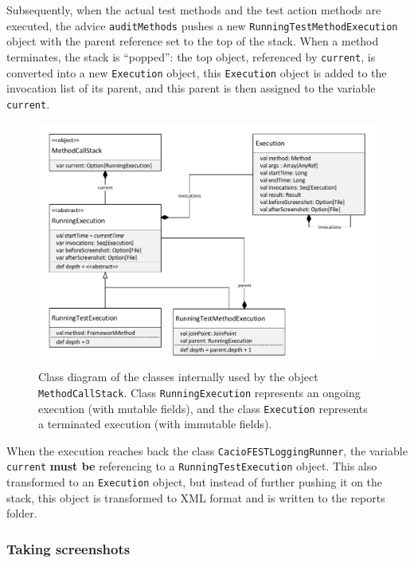 Subsequently, when the actual test methods and the test action methods are executed, the advice \texttt{auditMethods} pushes a new \texttt{RunningTestMethodExecution} object with the parent reference set to the top of the stack. When a method terminates, the stack is ``popped'': the top object, referenced by \texttt{current}, is converted into a new \texttt{Execution} object, this \texttt{Execution} object is added to the invocation list of its parent, and this parent is then assigned to the variable \texttt{current}.

\begin{figure}[h!]
\centering
  \includegraphics[width=1\textwidth]{images/FESTLogging-MethodCallStack.pdf}
\caption{Class diagram of the classes internally used by the object \texttt{MethodCallStack}. Class \texttt{RunningExecution} represents an ongoing execution (with mutable fields), and the class \texttt{Execution} represents a terminated execution (with immutable fields).}
\label{fig:fest-logging-MethodCallStack}
\end{figure}

When the execution reaches back the class \texttt{CacioFESTLoggingRunner}, the variable \texttt{current} \textbf{must be} referencing to a \texttt{RunningTestExecution} object. This also transformed to an \texttt{Execution} object, but instead of further pushing it on the stack, this object is transformed to XML format and is written to the reports folder.

\subsubsection{Taking screenshots}

